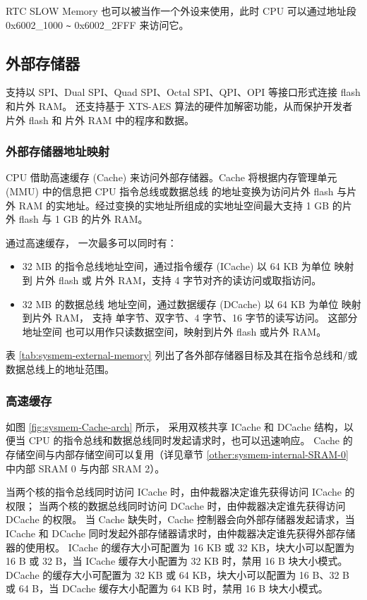 \documentclass[main\_\_CN.tex]{subfiles}
\begin{document}
RTC SLOW Memory 也可以被当作一个外设来使用，此时 CPU 可以通过地址段 0x{}6002\_1000 \verb+~+ 0x{}6002\_2FFF 来访问它。


\subsection{外部存储器}
\label{para:sysmem-external-memory}

\chipname{} 支持以 SPI、Dual SPI、Quad SPI、Octal SPI、QPI、OPI 等接口形式连接 flash 和片外 RAM。
\chipname{} 还支持基于 XTS-AES 算法的硬件加解密功能，从而保护开发者片外 flash 和 片外 RAM 中的程序和数据。

\subsubsection{外部存储器地址映射}

CPU 借助高速缓存 (Cache) 来访问外部存储器。Cache 将根据内存管理单元 (MMU) 中的信息把 CPU 指令总线或数据总线 的地址变换为访问片外 flash 与片外 RAM 的实地址。经过变换的实地址所组成的实地址空间最大支持 1 GB 的片外 flash 与 1 GB 的片外 RAM。

通过高速缓存，\chipname{} 一次最多可以同时有：
\begin{itemize}
    \item 32 MB 的指令总线地址空间，通过指令缓存 (ICache) 以 64 KB 为单位 映射到 片外 flash 或 片外 RAM，支持 4 字节对齐的读访问或取指访问。
    \item 32 MB 的数据总线 地址空间，通过数据缓存 (DCache) 以 64 KB 为单位 映射到片外 RAM， 支持 单字节、双字节、4 字节、16 字节的读写访问。 这部分地址空间 也可以用作只读数据空间，映射到片外 flash 或片外 RAM。
\end{itemize}
表 \ref{tab:sysmem-external-memory} 列出了各外部存储器目标及其在指令总线和/或数据总线上的地址范围。




\subsubsection{高速缓存}

如图 \ref{fig:sysmem-Cache-arch} 所示， \chipname{} 采用双核共享 ICache 和 DCache 结构，以便当 CPU 的指令总线和数据总线同时发起请求时，也可以迅速响应。
Cache 的存储空间与内部存储空间可以复用（详见章节 \ref{other:sysmem-internal-SRAM-0} 中内部 SRAM 0 与内部 SRAM 2）。

当两个核的指令总线同时访问 ICache 时，由仲裁器决定谁先获得访问 ICache 的权限；
当两个核的数据总线同时访问 DCache 时，由仲裁器决定谁先获得访问 DCache 的权限。
当 Cache 缺失时，Cache 控制器会向外部存储器发起请求，当 ICache 和 DCache 同时发起外部存储器请求时，由仲裁器决定谁先获得外部存储器的使用权。
ICache 的缓存大小可配置为 16 KB 或 32 KB，块大小可以配置为 16 B 或 32 B，当 ICache 缓存大小配置为 32 KB 时，禁用 16 B 块大小模式。
DCache 的缓存大小可配置为 32 KB 或 64 KB，块大小可以配置为 16 B、32 B 或 64 B，当 DCache 缓存大小配置为 64 KB 时，禁用 16 B 块大小模式。
\end{document}
